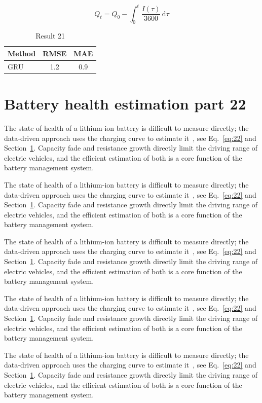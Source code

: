\documentclass[11pt]{article}
\begin{document}
\begin{equation}\label{eq:21}
  Q_t = Q_0 - \int_0^t \frac{I(\tau)}{3600}\,\mathrm{d}\tau
\end{equation}
\begin{table}[h]\centering\begin{tabular}{lcc}\toprule Method & RMSE & MAE\\\midrule GRU & 1.2 & 0.9\\\bottomrule\end{tabular}\caption{Result 21}\end{table}

\section{Battery health estimation part 22}\label{sec:22}
The state of health of a lithium-ion battery is difficult to measure directly; the data-driven approach uses the charging curve to estimate it~\cite{a2020}, see Eq.~\eqref{eq:22} and Section~\ref{sec:22}. Capacity fade and resistance growth directly limit the driving range of electric vehicles, and the efficient estimation of both is a core function of the battery management system.

The state of health of a lithium-ion battery is difficult to measure directly; the data-driven approach uses the charging curve to estimate it~\cite{a2020}, see Eq.~\eqref{eq:22} and Section~\ref{sec:22}. Capacity fade and resistance growth directly limit the driving range of electric vehicles, and the efficient estimation of both is a core function of the battery management system.

The state of health of a lithium-ion battery is difficult to measure directly; the data-driven approach uses the charging curve to estimate it~\cite{a2020}, see Eq.~\eqref{eq:22} and Section~\ref{sec:22}. Capacity fade and resistance growth directly limit the driving range of electric vehicles, and the efficient estimation of both is a core function of the battery management system.

The state of health of a lithium-ion battery is difficult to measure directly; the data-driven approach uses the charging curve to estimate it~\cite{a2020}, see Eq.~\eqref{eq:22} and Section~\ref{sec:22}. Capacity fade and resistance growth directly limit the driving range of electric vehicles, and the efficient estimation of both is a core function of the battery management system.

The state of health of a lithium-ion battery is difficult to measure directly; the data-driven approach uses the charging curve to estimate it~\cite{a2020}, see Eq.~\eqref{eq:22} and Section~\ref{sec:22}. Capacity fade and resistance growth directly limit the driving range of electric vehicles, and the efficient estimation of both is a core function of the battery management system.
\end{document}
